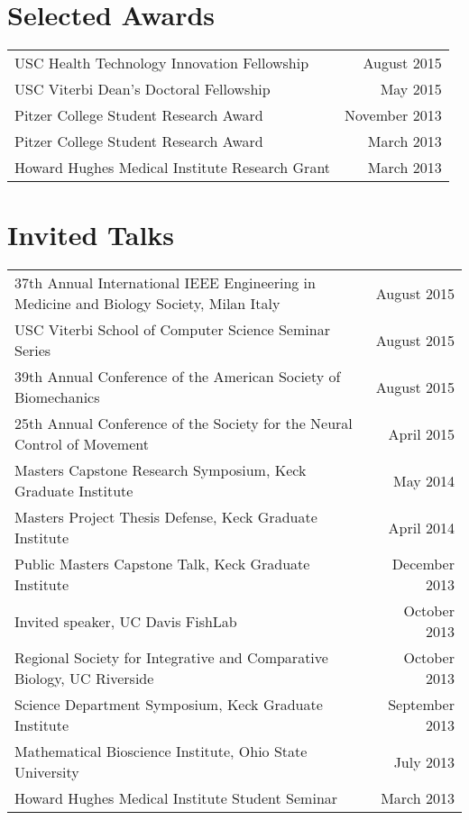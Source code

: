 \documentclass[10pt,a4paper]{article}
\begin{document}
  \vspace*{2mm}\section*{Selected Awards}
  
  \vspace*{1mm}\noindent\begin{tabularx}{17cm}{X r}
  
    USC Health Technology Innovation Fellowship & August 2015 \\ 
    USC Viterbi Dean's Doctoral Fellowship  & May 2015 \\
    Pitzer College Student Research Award & November 2013 \\
    Pitzer College Student Research Award & March 2013 \\
    Howard Hughes Medical Institute Research Grant & March 2013
  \end{tabularx}

  \vspace*{2mm}\section*{Invited Talks}

  \vspace*{1mm}\noindent\begin{tabularx}{17cm}{X r}
    37th Annual International IEEE Engineering in Medicine and Biology Society, Milan Italy & August 2015 \\
    USC Viterbi School of Computer Science Seminar Series & August 2015 \\
    39th Annual Conference of the American Society of Biomechanics & August 2015 \\
    25th Annual Conference of the Society for the Neural Control of Movement & April 2015 \\
    Masters Capstone Research Symposium, Keck Graduate Institute & May 2014 \\
    Masters Project Thesis Defense, Keck Graduate Institute & April 2014 \\
    Public Masters Capstone Talk, Keck Graduate Institute & December 2013 \\
    Invited speaker, UC Davis FishLab & October 2013 \\
    Regional Society for Integrative and Comparative Biology, UC Riverside & October 2013 \\
    Science Department Symposium, Keck Graduate Institute & September 2013 \\
    Mathematical Bioscience Institute, Ohio State University & July 2013\\
    Howard Hughes Medical Institute Student Seminar & March 2013
  \end{tabularx}
\end{document}
